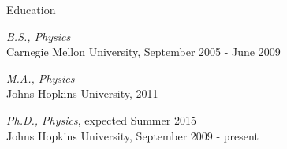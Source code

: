 \newlength{\oldcvlabelwidth}
\newlength{\oldcvlabelsep}

\setlength{\oldcvlabelwidth}{\cvlabelwidth}
\setlength{\oldcvlabelsep}{\cvlabelsep}

\setlength{\cvlabelwidth}{1em}

\begin{cvlist}{Education}
\item \emph{B.S., Physics}\\
Carnegie Mellon University, September 2005 - June 2009
\item \emph{M.A., Physics}\\
Johns Hopkins University, 2011
\item \emph{Ph.D., Physics}, expected Summer 2015\\
  Johns Hopkins University, September  2009 - present  
\end{cvlist}

\setlength{\cvlabelwidth}{0em}
\setlength{\cvlabelsep}{\labelsep}

